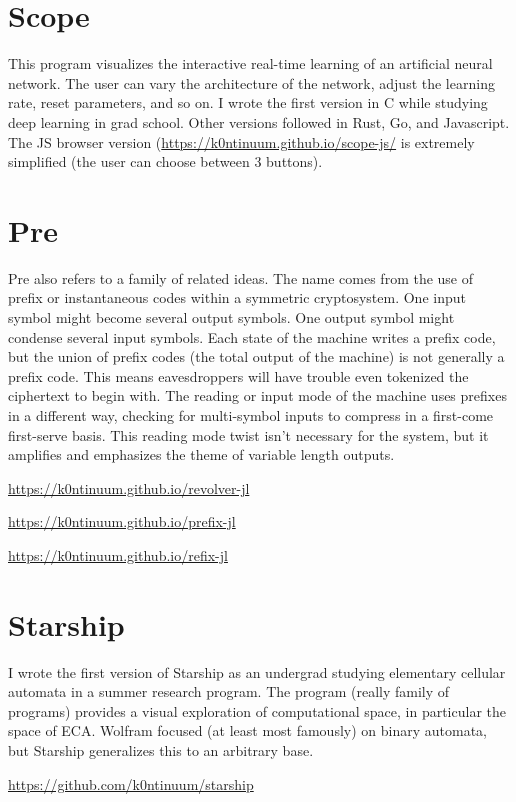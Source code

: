 \documentclass{article}
\begin{document}
{{\section*{Scope}

This program visualizes the interactive real-time learning of an artificial neural network. The user can vary the architecture of the network, adjust the learning rate, reset parameters, and so on.  I wrote the first version in C while studying deep learning in grad school. Other versions followed in Rust, Go, and Javascript. The JS browser version (\url{https://k0ntinuum.github.io/scope-js/} is extremely simplified (the user can choose between $3$ buttons). 


\section*{Pre}
Pre also refers to a family of related ideas. The name comes from the use of prefix or instantaneous codes within a symmetric cryptosystem. One input symbol might become several output symbols. One output symbol might condense several input symbols. Each state of the machine writes a prefix code, but the union of prefix codes (the total output of the machine) is not generally a prefix code. This means eavesdroppers will have trouble even tokenized the ciphertext to begin with. The reading or input mode of the machine uses prefixes in a different way, checking for multi-symbol inputs to compress in a first-come first-serve basis. This reading mode twist isn't necessary for the system, but it amplifies and emphasizes the theme of variable length outputs.  

\url{https://k0ntinuum.github.io/revolver-jl}

\url{https://k0ntinuum.github.io/prefix-jl}

\url{https://k0ntinuum.github.io/refix-jl}


\section*{Starship}

I wrote the first version of Starship as an undergrad studying elementary cellular automata in a summer research program. The program (really family of programs) provides a visual exploration of computational space, in particular the space of ECA. Wolfram focused (at least most famously) on binary automata, but Starship generalizes this to an arbitrary base.

\url{https://github.com/k0ntinuum/starship}










}}
\end{document}
